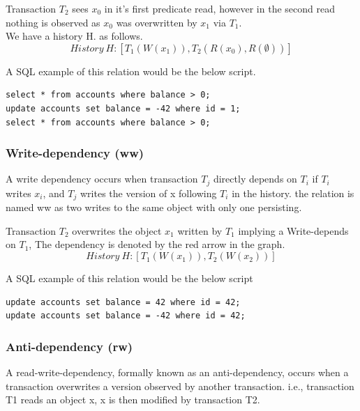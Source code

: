 \documentclass[a4paper,10pt,titlepage]{report}
\begin{document}
\vspace{2mm}

\vspace{2mm}


Transaction $T_2$ sees $x_0$ in it's first predicate read, however in the second read nothing is observed as $x_0$ was overwritten by $x_1$ via $T_1$. \\

We have a history H. as follows.
\begin{equation}
    History\ H: [T_1(W(x_1)), T_2(R(x_0),R(\emptyset))]
\end{equation}

A SQL example of this relation would be the below script.

\begin{lstlisting}
select * from accounts where balance > 0;
update accounts set balance = -42 where id = 1;
select * from accounts where balance > 0;
\end{lstlisting}
        
        
\subsubsection{Write-dependency (ww)}
A write dependency occurs when transaction $T_j$ directly depends on $T_i$ if $T_i$ writes $x_i$, and $T_j$ writes the version of x following $T_i$ in the history. the relation is named ww as two writes to the same object with only one persisting.

\vspace{2mm}

\vspace{2mm}


Transaction $T_2$ overwrites the object $x_1$ written by $T_1$ implying a Write-depends on $T_1$, The dependency is denoted by the red arrow in the graph. \\

\begin{equation}
    History\ H: [T_1(W(x_1)), T_2(W(x_2))]
\end{equation}

A SQL example of this relation would be the below script

\begin{lstlisting}
update accounts set balance = 42 where id = 42;
update accounts set balance = -42 where id = 42;
\end{lstlisting}


\subsubsection{Anti-dependency (rw)}
A read-write-dependency, formally known as an anti-dependency, occurs when a transaction overwrites a version observed by another transaction. i.e., transaction T1 reads an object x, x is then modified by transaction T2.
\end{document}
